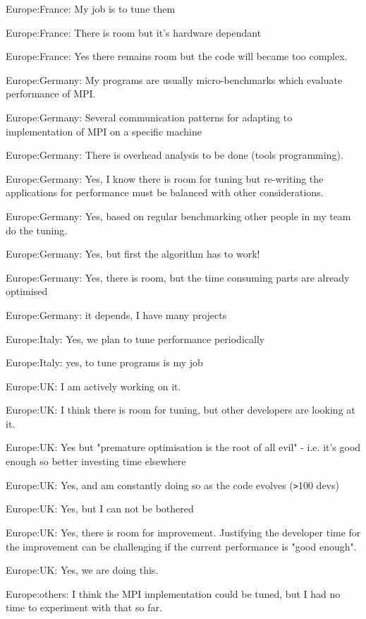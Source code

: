 \item Europe:France: My job is to tune them
\item Europe:France: There is room but it's hardware dependant
\item Europe:France: Yes there remains room but the code will became too complex.
\item Europe:Germany: My programs are usually micro-benchmarks which evaluate performance of MPI.
\item Europe:Germany: Several communication patterns for adapting to implementation of MPI on a specific machine
\item Europe:Germany: There is overhead analysis to be done (tools programming).
\item Europe:Germany: Yes, I know there is room for tuning but re-writing the applications for performance must be balanced with other considerations.
\item Europe:Germany: Yes, based on regular benchmarking other people in my team do the tuning.
\item Europe:Germany: Yes, but first the algorithm has to work!
\item Europe:Germany: Yes, there is room, but the time consuming parts are already optimised
\item Europe:Germany: it depends, I have many projects
\item Europe:Italy: Yes, we plan to tune performance periodically
\item Europe:Italy: yes, to tune programs is my job
\item Europe:UK: I am actively working on it.
\item Europe:UK: I think there is room for tuning, but other developers are looking at it.
\item Europe:UK: Yes but "premature optimisation is the root of all evil" - i.e. it's good enough so better investing time elsewhere
\item Europe:UK: Yes, and am constantly doing so as the code evolves (\verb!>!100 devs)
\item Europe:UK: Yes, but I can not be bothered
\item Europe:UK: Yes, there is room for improvement. Justifying the developer time for the improvement can be challenging if the current performance is "good enough".
\item Europe:UK: Yes, we are doing this.
\item Europe:others: I think the MPI implementation could be tuned, but I had no time to experiment with that so far.
